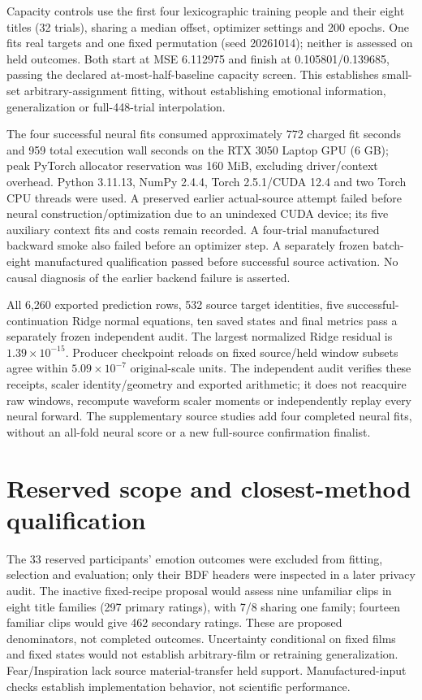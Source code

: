 \documentclass[10pt,a4paper]{article}
\begin{document}
Capacity controls use the first four lexicographic training people and their eight titles (32 trials), sharing a median offset, optimizer settings and 200 epochs. One fits real targets and one fixed permutation (seed 20261014); neither is assessed on held outcomes. Both start at MSE 6.112975 and finish at 0.105801/0.139685, passing the declared at-most-half-baseline capacity screen. This establishes small-set arbitrary-assignment fitting, without establishing emotional information, generalization or full-448-trial interpolation.

The four successful neural fits consumed approximately 772 charged fit seconds and 959 total execution wall seconds on the RTX 3050 Laptop GPU (6 GB); peak PyTorch allocator reservation was 160 MiB, excluding driver/context overhead. Python 3.11.13, NumPy 2.4.4, Torch 2.5.1/CUDA 12.4 and two Torch CPU threads were used. A preserved earlier actual-source attempt failed before neural construction/optimization due to an unindexed CUDA device; its five auxiliary context fits and costs remain recorded. A four-trial manufactured backward smoke also failed before an optimizer step. A separately frozen batch-eight manufactured qualification passed before successful source activation. No causal diagnosis of the earlier backend failure is asserted.

All 6,260 exported prediction rows, 532 source target identities, five successful-continuation Ridge normal equations, ten saved states and final metrics pass a separately frozen independent audit. The largest normalized Ridge residual is \(1.39\times10^{-15}\). Producer checkpoint reloads on fixed source/held window subsets agree within \(5.09\times10^{-7}\) original-scale units. The independent audit verifies these receipts, scaler identity/geometry and exported arithmetic; it does not reacquire raw windows, recompute waveform scaler moments or independently replay every neural forward. The supplementary source studies add four completed neural fits, without an all-fold neural score or a new full-source confirmation finalist.

\section{Reserved scope and closest-method qualification}
The 33 reserved participants' emotion outcomes were excluded from fitting, selection and evaluation; only their BDF headers were inspected in a later privacy audit. The inactive fixed-recipe proposal would assess nine unfamiliar clips in eight title families (297 primary ratings), with 7/8 sharing one family; fourteen familiar clips would give 462 secondary ratings. These are proposed denominators, not completed outcomes. Uncertainty conditional on fixed films and fixed states would not establish arbitrary-film or retraining generalization. Fear/Inspiration lack source material-transfer held support. Manufactured-input checks establish implementation behavior, not scientific performance.
\end{document}
